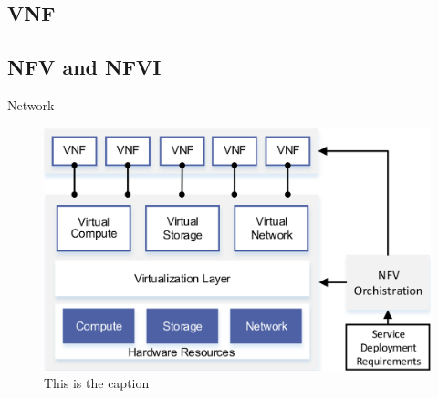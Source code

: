 \subsection{VNF}

\subsection{NFV and NFVI}

Network 

\begin{figure}[H]
	\centering
	\includegraphics[width=1\linewidth]{images/nfvi.png}
	\caption{This is the caption \cite{li2015software}}
	\label{img:nfvi}
\end{figure}

